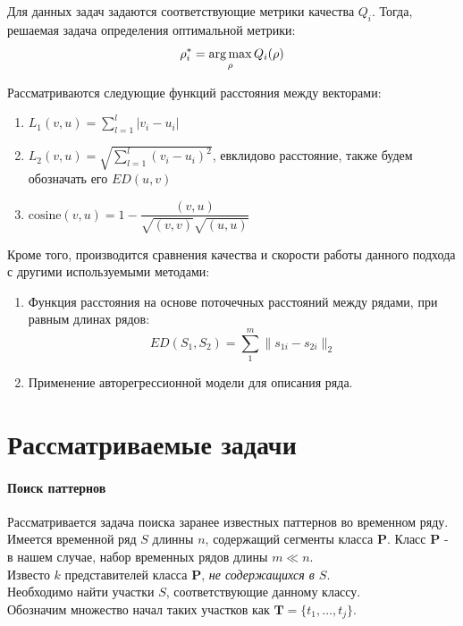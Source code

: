 \documentclass[12pt,twoside]{article}
\begin{document}
        Для данных задач задаются соответствующие метрики качества $Q_i$.
        Тогда, решаемая задача определения оптимальной метрики:
        $$
            \rho_i^* = \argmax_\rho Q_i(\rho)
        $$

        Рассматриваются следующие функций расстояния между векторами:         
        \begin{enumerate}[label=\arabic*)]
            \item $L_1(v, u) = {\displaystyle\sum_{l = 1}^{l} |v_i - u_i|}$
            \item $L_2(v, u) = \sqrt{\displaystyle\sum_{l = 1}^{l} (v_i - u_i)^2}$,
                евклидово расстояние, также будем обозначать его $ED(u, v)$
            \item $\text{cosine}(v, u) = 1 - \dfrac{(v, u)}{\sqrt{(v, v)}\sqrt{(u, u)}}$
        \end{enumerate}

        Кроме того, производится сравнения качества и скорости работы данного подхода с другими используемыми методами:
        \begin{enumerate}[label=\arabic*)]
            \item Функция расстояния на основе поточечных расстояний между рядами, при равным длинах рядов:
                $$
                    ED(S_1, S_2) = \sum\limits_1^m \|s_{1i} - s_{2i}\|_2
                $$

            \item Применение авторегрессионной модели для описания ряда.
        \end{enumerate}
    
    \section{Рассматриваемые задачи}\label{tasks}
        \paragraph{Поиск паттернов}
        
        Рассматривается задача поиска заранее известных паттернов во временном ряду. 
        Имеется временной ряд $S$ длинны $n$, содержащий сегменты класса $\boldsymbol{P}$.
        Класс $\boldsymbol{P}$ \-- в нашем случае, набор временных рядов длины $m \ll n$. \\
        Известо $k$ представителей класса $\boldsymbol{P}$, \textit{не содержащихся в $S$}. \\
        Необходимо найти участки $S$, соответствующие данному классу. \\
        Обозначим множество начал таких участков как $\boldsymbol{T} = \{t_1, \dots, t_j \}$.
\end{document}
